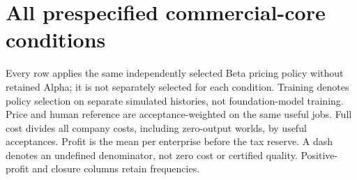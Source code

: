 \section{All prespecified commercial-core conditions}\label{app:commercial-core-conditions}

Every row applies the same independently selected Beta pricing policy without retained Alpha; it is not separately selected for each condition. Training denotes policy selection on separate simulated histories, not foundation-model training. Price and human reference are acceptance-weighted on the same useful jobs. Full cost divides all company costs, including zero-output worlds, by useful acceptances. Profit is the mean per enterprise before the tax reserve. A dash denotes an undefined denominator, not zero cost or certified quality. Positive-profit and closure columns retain frequencies.

